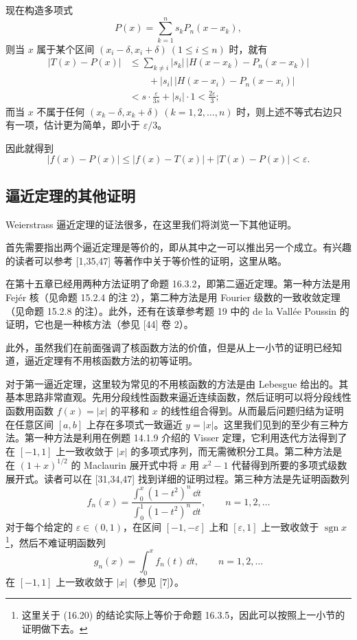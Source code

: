 现在构造多项式
\[
  P(x)=\sum_{k=1}^n s_kP_n(x-x_k),
\]
则当 $x$ 属于某个区间 $(x_i-\delta,x_i+\delta)\ (1\leqslant i\leqslant n)$ 时，就有
\[
\begin{aligned}
  |T(x)-P(x)|
  &\leqslant\sum_{k\ne i}|s_k|\,|H(x-x_k)-P_n(x-x_k)|\\
  &\qquad+|s_i|\,|H(x-x_i)-P_n(x-x_i)|\\
  &<s\cdot\frac{\varepsilon}{3s}+|s_i|\cdot1<\frac{2\varepsilon}{3};
\end{aligned}
\]
而当 $x$ 不属于任何 $(x_k-\delta,x_k+\delta)\ (k=1,2,\ldots,n)$ 时，则上述不等式右边只有一项，估计更为简单，即小于 $\varepsilon/3$。

因此就得到
\[
  |f(x)-P(x)|\leqslant|f(x)-T(x)|+|T(x)-P(x)|<\varepsilon.
\]

\subsection{逼近定理的其他证明}

Weierstrass 逼近定理的证法很多，在这里我们将浏览一下其他证明。

首先需要指出两个逼近定理是等价的，即从其中之一可以推出另一个成立。有兴趣的读者可以参考 [1,35,47] 等著作中关于等价性的证明，这里从略。

在第十五章已经用两种方法证明了命题 16.3.2，即第二逼近定理。第一种方法是用 Fejér 核（见命题 15.2.4 的注 2），第二种方法是用 Fourier 级数的一致收敛定理（见命题 15.2.8 的注）。此外，还有在该章参考题 19 中的 de la Vallée Poussin 的证明，它也是一种核方法（参见 [44] 卷 2）。

此外，虽然我们在前面强调了核函数方法的价值，但是从上一小节的证明已经知道，逼近定理有不用核函数方法的初等证明。

对于第一逼近定理，这里较为常见的不用核函数的方法是由 Lebesgue 给出的。其基本思路非常直观。先用分段线性函数来逼近连续函数，然后证明可以将分段线性函数用函数 $f(x)=|x|$ 的平移和 $x$ 的线性组合得到。从而最后问题归结为证明在任意区间 $[a,b]$ 上存在多项式一致逼近 $y=|x|$。这里我们见到的至少有三种方法。第一种方法是利用在例题 14.1.9 介绍的 Visser 定理，它利用迭代方法得到了在 $[-1,1]$ 上一致收敛于 $|x|$ 的多项式序列，而无需微积分工具。第二种方法是在 $(1+x)^{1/2}$ 的 Maclaurin 展开式中将 $x$ 用 $x^2-1$ 代替得到所要的多项式级数展开式。读者可以在 [31,34,47] 找到详细的证明过程。第三种方法是先证明函数列
\begin{equation}
  f_n(x)=\frac{\displaystyle\int_0^x(1-t^2)^n\,\dd t}
  {\displaystyle\int_0^1(1-t^2)^n\,\dd t},\qquad n=1,2,\ldots
\tag{16.20}
\label{eq:16.20}
\end{equation}
对于每个给定的 $\varepsilon\in(0,1)$，在区间 $[-1,-\varepsilon]$ 上和 $[\varepsilon,1]$ 上一致收敛于 $\operatorname{sgn}x$\footnote{这里关于 (16.20) 的结论实际上等价于命题 16.3.5，因此可以按照上一小节的证明做下去。}，然后不难证明函数列
\[
  g_n(x)=\int_0^x f_n(t)\,\dd t,\qquad n=1,2,\ldots
\]
在 $[-1,1]$ 上一致收敛于 $|x|$（参见 [7]）。

